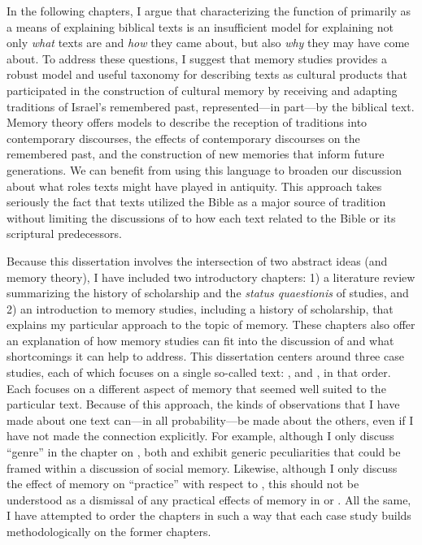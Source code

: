 In the following chapters, I argue that characterizing the function of \rwb primarily as a means of explaining biblical texts is an insufficient model for explaining not only \emph{what} \rwb texts are and \emph{how} they came about, but also \emph{why} they may have come about. To address these questions, I suggest that memory studies provides a robust model and useful taxonomy for describing \rwb texts as cultural products that participated in the construction of cultural memory by receiving and adapting traditions of Israel's remembered past, represented---in part---by the biblical text. Memory theory offers models to describe the reception of traditions into contemporary discourses, the effects of contemporary discourses on the remembered past, and the construction of new memories that inform future generations. We can benefit from using this language to broaden our discussion about what roles \rwb texts might have played in antiquity. This approach takes seriously the fact that \rwb texts utilized the Bible as a major source of tradition without limiting the discussions of \rwb to how each text related to the Bible or its scriptural predecessors.



Because this dissertation involves the intersection of two abstract ideas (\rwb and memory theory), I have included two introductory chapters: 1) a literature review summarizing the history of scholarship and the \emph{status quaestionis} of \rwb studies, and 2) an introduction to memory studies, including a history of scholarship, that explains my particular approach to the topic of memory. These chapters also offer an explanation of how memory studies can fit into the discussion of \rwb and what shortcomings it can help to address. This dissertation centers around three case studies, each of which focuses on a single so-called \rwb text: \chronicles, \ga and \jub, in that order. Each focuses on a different aspect of memory that seemed well suited to the particular text. Because of this approach, the kinds of observations that I have made about one text can---in all probability---be made about the others, even if I have not made the connection explicitly. For example, although I only discuss ``genre'' in the chapter on \ga, both \chronicles and \jub exhibit generic peculiarities that could be framed within a discussion of social memory. Likewise, although I only discuss the effect of memory on ``practice'' with respect to \jub, this should not be understood as a dismissal of any practical effects of memory in \chronicles or \ga. All the same, I have attempted to order the chapters in such a way that each case study builds methodologically on the former chapters.

